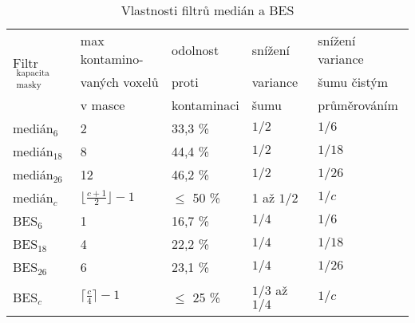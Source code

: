 \begin{table}[h]\label{tab med BES}
    \begin{center}
    \begin{tabular}{lllll}
      \toprule
      \multirow{3}{*}{Filtr$_{\mathrm{\substack{kapacita\\ masky}}}$} & max kontamino- & odolnost    & snížení    & snížení variance \\
                                                    & vaných voxelů   & proti       & variance   & šumu čistým      \\
                                                    & v masce         & kontaminaci & šumu       & průměrováním     \\
      \midrule
      medián$_{\mathrm{6}}$             & 2                 & 33,3 \%       & $1/2$    & $1/6$ \\
      medián$_{\mathrm{18}}$            & 8                 & 44,4 \%       & $1/2$    & $1/18$ \\
      medián$_{\mathrm{26}}$            & 12                & 46,2 \%       & $1/2$    & $1/26$  \\
      medián$_{c}$                      & $\lfloor\frac{c+1}{2}\rfloor-1$& $\le$ 50 \%& 1 až $1/2$& $1/c$\\
      BES$_{\mathrm{6}}$                & 1                 & 16,7 \%       & $1/4$   & $1/6$ \\
      BES$_{\mathrm{18}}$               & 4                 & 22,2 \%       & $1/4$   & $1/18$ \\
      BES$_{\mathrm{26}}$               & 6                 & 23,1 \%       & $1/4$   & $1/26$ \\
      BES$_{c}$                         & $\lceil\frac{c}{4}\rceil-1$& $\le$ 25 \%& $1/3$ až $1/4$& $1/c$\\
      \bottomrule
    \end{tabular}
    \caption{Vlastnosti filtrů medián a BES}
    \end{center}
\end{table} 
    
